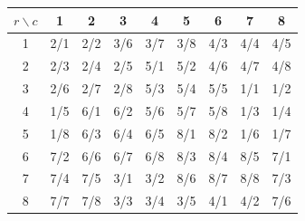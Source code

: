 \begin{center}
\footnotesize
\setlength{\tabcolsep}{2pt}
\renewcommand{\arraystretch}{1.05}
\begin{tabular}{c|cccccccc}
\toprule
$r\backslash c$ & 1 & 2 & 3 & 4 & 5 & 6 & 7 & 8 \\
\midrule
1 & 2/1 & 2/2 & 3/6 & 3/7 & 3/8 & 4/3 & 4/4 & 4/5 \\
2 & 2/3 & 2/4 & 2/5 & 5/1 & 5/2 & 4/6 & 4/7 & 4/8 \\
3 & 2/6 & 2/7 & 2/8 & 5/3 & 5/4 & 5/5 & 1/1 & 1/2 \\
4 & 1/5 & 6/1 & 6/2 & 5/6 & 5/7 & 5/8 & 1/3 & 1/4 \\
5 & 1/8 & 6/3 & 6/4 & 6/5 & 8/1 & 8/2 & 1/6 & 1/7 \\
6 & 7/2 & 6/6 & 6/7 & 6/8 & 8/3 & 8/4 & 8/5 & 7/1 \\
7 & 7/4 & 7/5 & 3/1 & 3/2 & 8/6 & 8/7 & 8/8 & 7/3 \\
8 & 7/7 & 7/8 & 3/3 & 3/4 & 3/5 & 4/1 & 4/2 & 7/6 \\
\bottomrule
\end{tabular}
\end{center}
